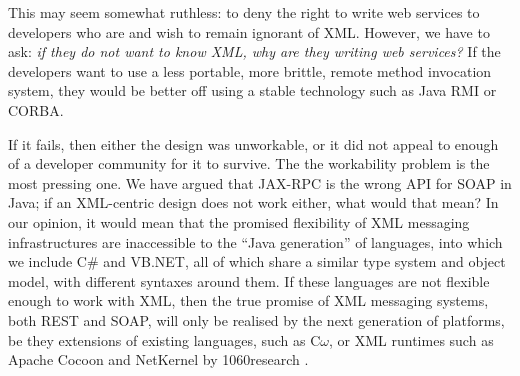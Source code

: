 This may seem somewhat ruthless: to deny the right to write web
services to developers who are and wish to remain ignorant of XML.
However, we have to ask: \emph{if they do not want to know XML, why are
they writing web services?} If the developers want to use a less portable,
more brittle, remote method invocation system, they would be better off
using a stable technology such as Java RMI or CORBA.

If it fails, then either the design was unworkable, or it did not
appeal to enough of a developer community for it to survive. The the
workability problem is the most pressing one. We have argued that
JAX-RPC is the wrong API for SOAP in Java; if an XML-centric design
does not work either, what would that mean? In our opinion, it would
mean that the promised flexibility of XML messaging infrastructures
are inaccessible to the ``Java generation'' of languages, into which
we include C\# and VB.NET, all of which share a similar type system
and object model, with different syntaxes around them. If these
languages are not flexible enough to work with XML, then the true
promise of XML messaging systems, both REST and SOAP, will only be
realised by the next generation of platforms, be they extensions of
existing languages, such as C$\omega$, or XML runtimes such as Apache
Cocoon and NetKernel by 1060research
\cite{MSFT:TransitionsInProgrammingModels,pjr:NKonTSS}.
